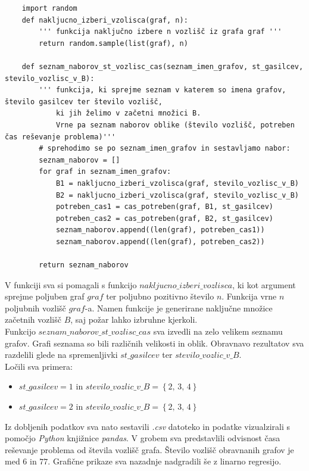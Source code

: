\documentclass[a4paper, 12pt]{article}
\begin{document}
\begin{scriptsize}
\begin{verbatim}
    import random
    def nakljucno_izberi_vzolisca(graf, n):
        ''' funkcija naključno izbere n vozlišč iz grafa graf '''
        return random.sample(list(graf), n)

    def seznam_naborov_st_vozlisc_cas(seznam_imen_grafov, st_gasilcev, stevilo_vozlisc_v_B):
        ''' funkcija, ki sprejme seznam v katerem so imena grafov, število gasilcev ter število vozlišč, 
            ki jih želimo v začetni množici B.
            Vrne pa seznam naborov oblike (število vozlišč, potreben čas reševanje problema)'''
        # sprehodimo se po seznam_imen_grafov in sestavljamo nabor:
        seznam_naborov = []
        for graf in seznam_imen_grafov:
            B1 = nakljucno_izberi_vzolisca(graf, stevilo_vozlisc_v_B)
            B2 = nakljucno_izberi_vzolisca(graf, stevilo_vozlisc_v_B)
            potreben_cas1 = cas_potreben(graf, B1, st_gasilcev)
            potreben_cas2 = cas_potreben(graf, B2, st_gasilcev)
            seznam_naborov.append((len(graf), potreben_cas1))
            seznam_naborov.append((len(graf), potreben_cas2))
        
        return seznam_naborov\end{verbatim}
\end{scriptsize}

\noindent V funkciji sva si pomagali s funkcijo $nakljucno\_izberi\_vozlisca$, ki kot 
argument sprejme poljuben graf $graf$ ter poljubno pozitivno število $n$. Funkcija vrne 
$n$ poljubnih vozlišč $graf$-a. Namen funkcije je generirane naključne množice začetnih 
vozlišč $B$, saj požar lahko izbruhne kjerkoli. \\

\noindent Funkcijo $seznam\_naborov\_st\_vozlisc\_cas$ sva izvedli na zelo velikem seznamu grafov. Grafi seznama
so bili različnih velikosti in oblik. Obravnavo rezultatov sva razdelili glede 
na spremenljivki $st\_gasilcev$ ter $stevilo\_vozlic\_v\_B$. \\
Ločili sva primera:
\begin{itemize}
    \item $st\_gasilcev = 1$ in $stevilo\_vozlic\_v\_B = \left\{ 2, \, 3, \, 4 \right\}$
    \item $st\_gasilcev = 2$ in $stevilo\_vozlic\_v\_B = \left\{ 2, \, 3, \, 4 \right\}$
\end{itemize}

\noindent Iz dobljenih podatkov sva nato sestavili \emph{.csv} datoteko in podatke vizualzirali s pomočjo \emph{Python} knjižnice \emph{pandas}. 
V grobem sva predstavlili odvisnost časa reševanje problema od števila vozlišč grafa. Število vozlišč obravnanih grafov
je med $6$ in $77$. Grafične prikaze sva nazadnje nadgradili še z linarno regresijo. 
\end{document}
